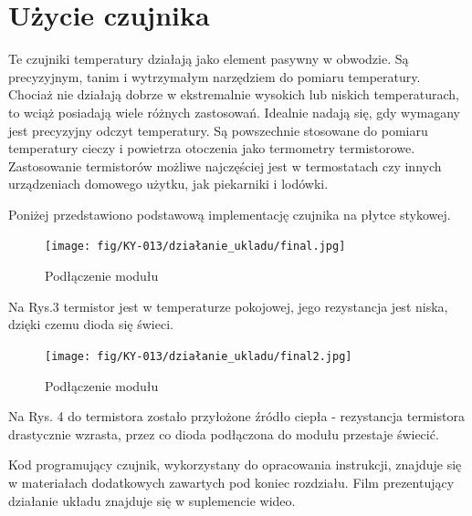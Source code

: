 \documentclass[11pt, a4paper]{article}
\begin{document}
\newpage
\section*{Użycie czujnika}
Te czujniki temperatury działają jako element pasywny w obwodzie. Są precyzyjnym, tanim i wytrzymałym narzędziem do pomiaru temperatury. Chociaż nie działają dobrze w ekstremalnie wysokich lub niskich temperaturach, to wciąż posiadają wiele różnych zastosowań. Idealnie nadają się, gdy wymagany jest precyzyjny odczyt temperatury. Są powszechnie stosowane do pomiaru temperatury cieczy i powietrza otoczenia jako termometry termistorowe. Zastosowanie termistorów możliwe najczęściej jest w termostatach czy innych urządzeniach domowego użytku, jak piekarniki i lodówki.
\vspace{0.5cm}

Poniżej przedstawiono podstawową implementację czujnika na płytce stykowej.

\vspace{0.5cm}
\begin{figure}[h!]
    \centering
    \texttt{[image: fig/KY-013/działanie\_ukladu/final.jpg]}
    \caption{Podłączenie modułu}
    \label{fig:my_label}
\end{figure}

Na Rys.3 termistor jest w temperaturze pokojowej, jego rezystancja jest niska, dzięki czemu dioda się świeci.

\vspace{0.5cm}

\begin{figure}[h!]
    \centering
    \texttt{[image: fig/KY-013/działanie\_ukladu/final2.jpg]}
    \caption{Podłączenie modułu}
    \label{fig:my_label}
\end{figure}

Na Rys. 4 do termistora zostało przyłożone źródło ciepła - rezystancja termistora drastycznie wzrasta, przez co dioda podłączona do modułu przestaje świecić.

\newpage 

Kod programujący czujnik, wykorzystany do opracowania instrukcji, znajduje się w materiałach dodatkowych zawartych pod koniec rozdziału.
\newline
Film prezentujący działanie układu znajduje się w suplemencie wideo.
\printbibliography[heading=bibintoc]
\end{document}
